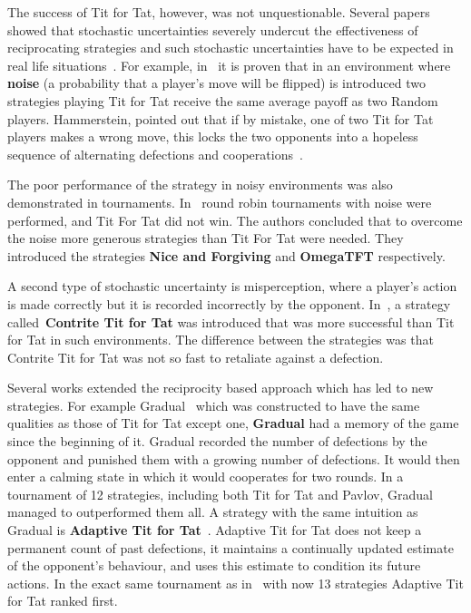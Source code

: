 \documentclass{article}
\theoremstyle{definition}
\begin{document}
The success of Tit for Tat, however, was not unquestionable. Several papers
showed that stochastic uncertainties severely undercut the effectiveness of
reciprocating strategies and such stochastic uncertainties have to be expected
in real life situations~\cite{Milinski1987}. For example, in~\cite{Molander1985}
it is
proven that in an environment where \textbf{noise} (a probability that a
player's move will be flipped) is introduced two strategies playing Tit for Tat
receive the same average payoff as two Random players.
Hammerstein, pointed out that if by mistake, one of two
Tit for Tat players makes a wrong move, this locks the two opponents into a
hopeless sequence of alternating defections and cooperations~\cite{Hammerstein1984}.

The poor performance of the strategy in noisy environments was also demonstrated
in tournaments. In~\cite{Bendor1991, Donninger1986} round robin
tournaments with noise were performed, and Tit For Tat did not win.
The authors concluded that to overcome the noise more generous strategies
than Tit For Tat were needed. They introduced the strategies \textbf{Nice and Forgiving}
and \textbf{OmegaTFT} respectively.

A second type of stochastic uncertainty is
misperception, where a player's action is made correctly but it is recorded
incorrectly by the opponent. In~\cite{Wu1995}, a strategy
called~\textbf{Contrite Tit for Tat} was introduced that was more successful than Tit for Tat
in such environments. The difference between the strategies was that Contrite
Tit for Tat was not so fast to retaliate against a defection.

Several works extended the reciprocity based approach which has led to new
strategies. For example Gradual~\cite{Beaufils1997} which was constructed to
have the same qualities as those of Tit for Tat except one,
\textbf{Gradual} had a memory of the game since the beginning of it. Gradual
recorded the number of defections by the opponent and punished them with a
growing number of defections. It would then enter a calming state in which it
would cooperates for two rounds. In a tournament of 12 strategies, including
both Tit for Tat and Pavlov, Gradual managed to outperformed them all. A
strategy with the same intuition as Gradual is \textbf{Adaptive Tit for
Tat}~\cite{tzafestas-2000a}. Adaptive Tit for Tat does not keep a permanent
count of past defections, it maintains a continually updated estimate of the
opponent’s behaviour, and uses this estimate to condition its future actions. In
the exact same tournament as in~\cite{Beaufils1997} with now 13 strategies Adaptive
Tit for Tat ranked first.
\end{document}
